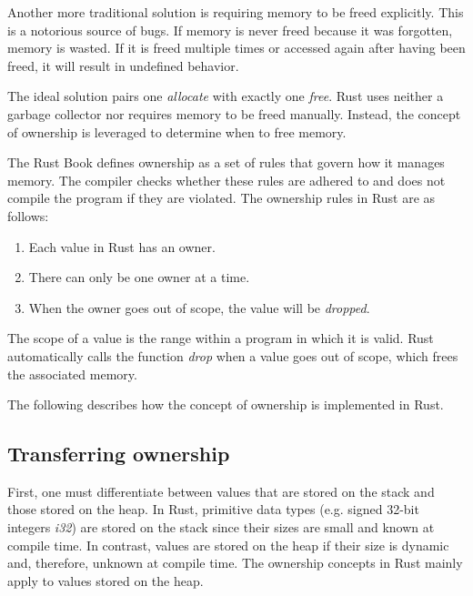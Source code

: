 \documentclass[sigplan,11pt,nonacm]{acmart}
\begin{document}
Another more traditional solution is requiring memory to be freed explicitly.
This is a notorious source of bugs.
If memory is never freed because it was forgotten, memory is wasted.
If it is freed multiple times or accessed again after having been freed, it will result in undefined behavior.

The ideal solution pairs one \emph{allocate} with exactly one \emph{free}.
Rust uses neither a garbage collector nor requires memory to be freed manually.
Instead, the concept of ownership is leveraged to determine when to free memory.

The Rust Book \cite{rust-book} defines ownership as a set of rules that govern how it manages memory.
The compiler checks whether these rules are adhered to and does not compile the program if they are violated.
The ownership rules in Rust are as follows:
\begin{enumerate}
  \item Each value in Rust has an owner.
  \item There can only be one owner at a time.
  \item When the owner goes out of scope, the value will be \emph{dropped}.
\end{enumerate}
The scope of a value is the range within a program in which it is valid.
Rust automatically calls the function \emph{drop} when a value goes out of scope, which frees the associated memory.

The following describes how the concept of ownership is implemented in Rust.

\subsection{Transferring ownership}
\label{sec:rust-transferring-ownership}

First, one must differentiate between values that are stored on the stack and those stored on the heap.
In Rust, primitive data types (e.g. signed 32-bit integers \emph{i32}) are stored on the stack since their sizes are small and known at compile time.
In contrast, values are stored on the heap if their size is dynamic and, therefore, unknown at compile time.
The ownership concepts in Rust mainly apply to values stored on the heap.
\end{document}
